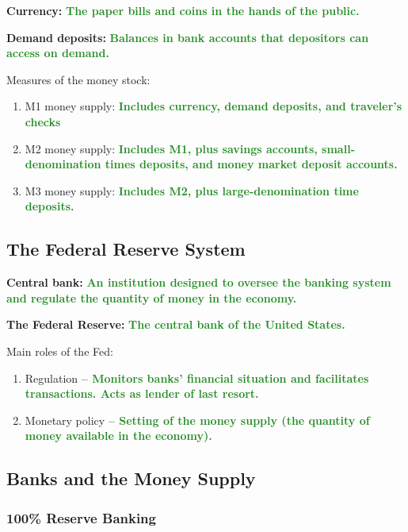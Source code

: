 \documentclass[11pt]{article}\usepackage[]{graphicx}\usepackage[]{color}
\theoremstyle{definition}
\newcommand{\ddp}[1]{{\textbf{\textcolor{ForestGreen}{#1}}}}
\newcommand{\defn}[1]{\textbf{#1}}
\begin{document}
\defn{Currency:} \ddp{The paper bills and coins in the hands of the public.\\}

\defn{Demand deposits:} \ddp{Balances in bank accounts that depositors can access on demand.\\}

Measures of the money stock:
\begin{enumerate}
	\setlength{\itemsep}{1em}
	\item M1 money supply: \ddp{Includes currency, demand deposits, and traveler's checks}
	\item M2 money supply: \ddp{Includes M1, plus savings accounts, small-denomination times deposits, and money market deposit accounts.}
	\item M3 money supply: \ddp{Includes M2, plus large-denomination time deposits.}
\end{enumerate}
\vspace{1em}

\subsection{The Federal Reserve System}

\defn{Central bank:} \ddp{An institution designed to oversee the banking system and regulate the quantity of money in the economy.\\}

\defn{The Federal Reserve:} \ddp{The central bank of the United States.\\}

Main roles of the Fed:
\begin{enumerate}
	\setlength{\itemsep}{1.5em}
	\item Regulation \ddp{-- Monitors banks' financial situation and facilitates transactions. Acts as lender of last resort.}
	\item Monetary policy \ddp{-- Setting of the money supply (the quantity of money available in the economy).}
\end{enumerate}

\subsection{Banks and the Money Supply}

\subsubsection*{100\% Reserve Banking}
\end{document}
